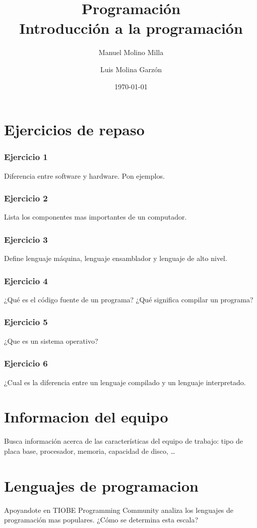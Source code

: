 \documentclass[a4paper,spanish]{article}
\author{Manuel Molino Milla \and Luis Molina Garzón}
\title{\textbf{Programación}
\\Introducción a la programación}
\date{\today}
\begin{document}
\maketitle \tableofcontents \setlongtables

\section{Ejercicios de repaso}
\subsubsection{Ejercicio 1}
Diferencia entre software y hardware. Pon ejemplos.
\subsubsection{Ejercicio 2}
Lista los componentes mas importantes de un computador.
\subsubsection{Ejercicio 3}
Define lenguaje máquina, lenguaje ensamblador y lenguaje de alto nivel.
\subsubsection{Ejercicio 4}
¿Qué es el código fuente de un programa? ¿Qué significa compilar un programa?
\subsubsection{Ejercicio 5}
¿Que es un sistema operativo?
\subsubsection{Ejercicio 6}
¿Cual es la diferencia entre un lenguaje compilado y un lenguaje interpretado.

\section{Informacion del equipo}
Busca información acerca de las características del equipo de trabajo: tipo de placa base, procesador, memoria, capacidad de disco, \dots
\section{Lenguajes de programacion}
Apoyandote en TIOBE Programming Community analiza los lenguajes
de programación mas populares. ¿Cómo se determina esta escala?
\end{document}
